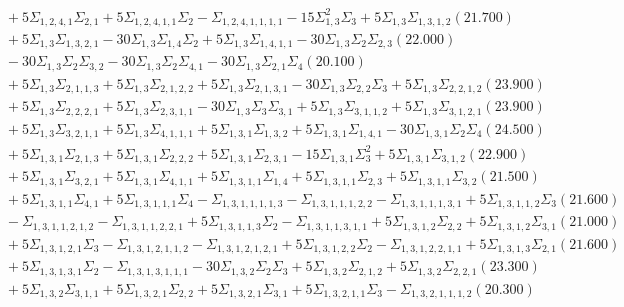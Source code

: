 \documentclass[12pt]{article}
\begin{document}
\begin{landscape}
\begin{align*}
		&\quad\quad +5\Sigma_{1,2,4,1}\Sigma_{2,1}+5\Sigma_{1,2,4,1,1}\Sigma_{2}-\Sigma_{1,2,4,1,1,1,1}-15\Sigma_{1,3}^{2}\Sigma_{3}+5\Sigma_{1,3}\Sigma_{1,3,1,2}(21.700) \\ 
		&\quad\quad +5\Sigma_{1,3}\Sigma_{1,3,2,1}-30\Sigma_{1,3}\Sigma_{1,4}\Sigma_{2}+5\Sigma_{1,3}\Sigma_{1,4,1,1}-30\Sigma_{1,3}\Sigma_{2}\Sigma_{2,3}(22.000) \\ 
		&\quad\quad -30\Sigma_{1,3}\Sigma_{2}\Sigma_{3,2}-30\Sigma_{1,3}\Sigma_{2}\Sigma_{4,1}-30\Sigma_{1,3}\Sigma_{2,1}\Sigma_{4}(20.100) \\ 
		&\quad\quad +5\Sigma_{1,3}\Sigma_{2,1,1,3}+5\Sigma_{1,3}\Sigma_{2,1,2,2}+5\Sigma_{1,3}\Sigma_{2,1,3,1}-30\Sigma_{1,3}\Sigma_{2,2}\Sigma_{3}+5\Sigma_{1,3}\Sigma_{2,2,1,2}(23.900) \\ 
		&\quad\quad +5\Sigma_{1,3}\Sigma_{2,2,2,1}+5\Sigma_{1,3}\Sigma_{2,3,1,1}-30\Sigma_{1,3}\Sigma_{3}\Sigma_{3,1}+5\Sigma_{1,3}\Sigma_{3,1,1,2}+5\Sigma_{1,3}\Sigma_{3,1,2,1}(23.900) \\ 
		&\quad\quad +5\Sigma_{1,3}\Sigma_{3,2,1,1}+5\Sigma_{1,3}\Sigma_{4,1,1,1}+5\Sigma_{1,3,1}\Sigma_{1,3,2}+5\Sigma_{1,3,1}\Sigma_{1,4,1}-30\Sigma_{1,3,1}\Sigma_{2}\Sigma_{4}(24.500) \\ 
		&\quad\quad +5\Sigma_{1,3,1}\Sigma_{2,1,3}+5\Sigma_{1,3,1}\Sigma_{2,2,2}+5\Sigma_{1,3,1}\Sigma_{2,3,1}-15\Sigma_{1,3,1}\Sigma_{3}^{2}+5\Sigma_{1,3,1}\Sigma_{3,1,2}(22.900) \\ 
		&\quad\quad +5\Sigma_{1,3,1}\Sigma_{3,2,1}+5\Sigma_{1,3,1}\Sigma_{4,1,1}+5\Sigma_{1,3,1,1}\Sigma_{1,4}+5\Sigma_{1,3,1,1}\Sigma_{2,3}+5\Sigma_{1,3,1,1}\Sigma_{3,2}(21.500) \\ 
		&\quad\quad +5\Sigma_{1,3,1,1}\Sigma_{4,1}+5\Sigma_{1,3,1,1,1}\Sigma_{4}-\Sigma_{1,3,1,1,1,1,3}-\Sigma_{1,3,1,1,1,2,2}-\Sigma_{1,3,1,1,1,3,1}+5\Sigma_{1,3,1,1,2}\Sigma_{3}(21.600) \\ 
		&\quad\quad -\Sigma_{1,3,1,1,2,1,2}-\Sigma_{1,3,1,1,2,2,1}+5\Sigma_{1,3,1,1,3}\Sigma_{2}-\Sigma_{1,3,1,1,3,1,1}+5\Sigma_{1,3,1,2}\Sigma_{2,2}+5\Sigma_{1,3,1,2}\Sigma_{3,1}(21.000) \\ 
		&\quad\quad +5\Sigma_{1,3,1,2,1}\Sigma_{3}-\Sigma_{1,3,1,2,1,1,2}-\Sigma_{1,3,1,2,1,2,1}+5\Sigma_{1,3,1,2,2}\Sigma_{2}-\Sigma_{1,3,1,2,2,1,1}+5\Sigma_{1,3,1,3}\Sigma_{2,1}(21.600) \\ 
		&\quad\quad +5\Sigma_{1,3,1,3,1}\Sigma_{2}-\Sigma_{1,3,1,3,1,1,1}-30\Sigma_{1,3,2}\Sigma_{2}\Sigma_{3}+5\Sigma_{1,3,2}\Sigma_{2,1,2}+5\Sigma_{1,3,2}\Sigma_{2,2,1}(23.300) \\ 
		&\quad\quad +5\Sigma_{1,3,2}\Sigma_{3,1,1}+5\Sigma_{1,3,2,1}\Sigma_{2,2}+5\Sigma_{1,3,2,1}\Sigma_{3,1}+5\Sigma_{1,3,2,1,1}\Sigma_{3}-\Sigma_{1,3,2,1,1,1,2}(20.300) \\ 

\end{align*}
\end{landscape}
\end{document}
